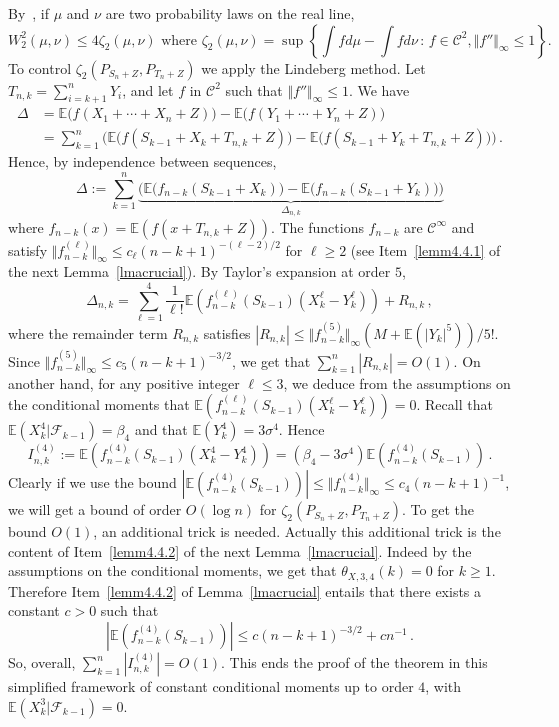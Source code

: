 \documentclass[AHL,Unicode,longabstracts,published]{cedram}
\newcommand{\bbE}{\mathbb{E}}
\newcommand{\clF}{\mathcal{F}}
\newcommand{\clC}{\mathcal{C}}
\begin{document}
By~\cite[Theorem~3.1]{Rio09}, if $\mu$ and $\nu$ are two probability laws on the real line,
\[
W^2_2 (\mu, \nu) \leq 4 \zeta_2 (\mu, \nu) \text{ where } \zeta_2 (\mu, \nu) = \sup \left\{ \int f d \mu - \int f d \nu \, : \, f \in \clC^2, \Vert f'' \Vert_{\infty} \leq 1\right\}.
\]
To control $ \zeta_2 (P_{S_n+Z}, P_{T_n+Z}) $ we apply the Lindeberg method. Let $T_{n,k} = \sum_{i=k+1}^n Y_i$, and let $f$ in $ \clC^2$ such that $ \Vert f'' \Vert_{\infty} \leq 1$. We have
\begin{align*}
\Delta & = \bbE \big(f (X_1+\cdots + X_n + Z)\big) - \bbE \big(f (Y_1+\cdots + Y_n + Z)\big) \\
& = \sum_{k=1}^n \Big(\bbE \big(f (S_{k-1} + X_k + T_{n,k} + Z)\big) - \bbE \big(f (S_{k-1} + Y_k + T_{n,k} + Z)\big) \Big) \,.
\end{align*}
Hence, by independence between sequences,
\[
\Delta := \sum_{k=1}^n \underbrace{ \Big (\bbE \big(f _{n-k}(S_{k-1} + X_k)\big) - \bbE \big(f _{n-k} (S_{k-1} + Y_k)\big) \Big)}_{ \Delta_{n,k} }
\]
where $f_{n-k} (x) =\bbE (f (x+ T_{n,k} + Z))$. The functions $f_{n-k}$ are $ \clC^{\infty}$ and satisfy $
\Vert f^{(\ell)}_{n-k} \Vert_{\infty} \leq c_{\ell} (n-k+1)^{-(\ell -2) /2 } $ for $\ell \geq 2$ (see Item~\eqref{lemm4.4.1} of the next Lemma~\ref{lmacrucial}). By Taylor's expansion at order $5$,
\[
\Delta_{n,k} = \sum_{\ell =1}^4 \frac{1 }{\ell !} \bbE \left (f^{(\ell)}_{n-k}(S_{k-1}) \left(X_k^{\ell} - Y_k^{\ell}\right) \right) +R_{n,k} \,,
\]
where the remainder term $R_{n,k}$ satisfies $|R_{n,k}| \leq \Vert f^{(5)}_{n-k} \Vert_{\infty} (M + \bbE (|Y_k|^5))/5! $. Since $\Vert f^{(5)}_{n-k} \Vert_{\infty} \leq c_{5} (n-k+1)^{-3 /2 } $, we get that $\sum_{k=1}^n |R_{n,k}| = O (1) $. On another hand, for any positive integer $\ell \leq 3$, we deduce from the assumptions on the conditional moments that $\bbE  (f^{(\ell)}_{n-k}(S_{k-1}) (X_k^{\ell} - Y_k^{\ell}) ) =0$. Recall that $\bbE(X^4_k | \clF_{k-1}) =\beta_4$ and that $ \bbE (Y_k^{4}) = 3 \sigma^4$. Hence
\[
I^{(4)}_{n,k} := \bbE \left(f^{(4)}_{n-k}(S_{k-1}) \left(X_k^{4} - Y_k^{4}\right) \right) = \left(\beta_4- 3 \sigma^4\right) \bbE \left(f^{(4)}_{n-k}(S_{k-1}) \right) \,.
\]
Clearly if we use the bound $| \bbE (f^{(4)}_{n-k}(S_{k-1})) | \leq \Vert f^{(4)}_{n-k} \Vert_{\infty} \leq c_4 (n-k+1)^{-1}$, we will get a bound of order $O (\log n)$ for $ \zeta_2 (P_{S_n+Z}, P_{T_n+Z}) $. To get the bound $O(1)$, an additional trick is needed. Actually this additional trick is the content of Item~\eqref{lemm4.4.2} of the next Lemma~\ref{lmacrucial}. Indeed by the assumptions on the conditional moments, we get that $\theta_{X,3,4} (k) =0$ for $k \geq 1$. Therefore Item~\eqref{lemm4.4.2} of Lemma~\ref{lmacrucial} entails that there exists a constant $c>0$ such that
\[
\left| \bbE \left(f_{n-k}^{(4) } ({ S}_{k-1})\right) \right | \leq c (n-k+1)^{-3/2} + c n^{ -1} \,.
\]
So, overall, $\sum_{k=1}^n |I^{(4)}_{n,k}| = O(1)$. This ends the proof of the theorem in this simplified framework of constant conditional moments up to order $4$, with $\bbE (X^3_k | \clF_{k-1}) =0$.
\end{document}
